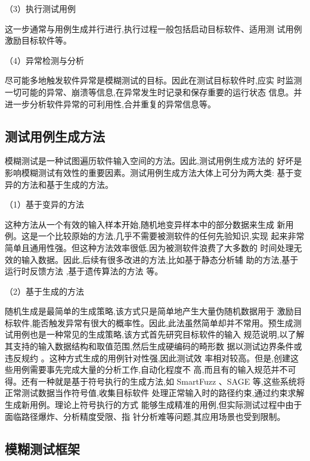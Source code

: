 （3）执行测试用例

这一步通常与用例生成并行进行,执行过程一般包括启动目标软件、适用测
试用例激励目标软件等。

（4）异常检测与分析

尽可能多地触发软件异常是模糊测试的目标。因此在测试目标软件时,应实
时监测一切可能的异常、崩溃等信息,在异常发生时记录和保存重要的运行状态
信息。并进一步分析软件异常的可利用性,合并重复的异常信息等。

\subsection{测试用例生成方法}

模糊测试是一种试图遍历软件输入空间的方法。因此,测试用例生成方法的
好坏是影响模糊测试有效性的重要因素。测试用例生成方法大体上可分为两大类:
基于变异的方法和基于生成的方法。

（1）基于变异的方法

这种方法从一个有效的输入样本开始,随机地变异样本中的部分数据来生成
新用例。这是一个比较原始的方法,几乎不需要被测软件的任何先验知识,实现
起来非常简单且通用性强。但这种方法效率很低,因为被测软件浪费了大多数的
时间处理无效的输入数据。因此,后续有很多改进的方法,比如基于静态分析辅
助的方法,基于运行时反馈方法 ,基于遗传算法的方法 等。

（2）基于生成的方法

随机生成是最简单的生成策略,该方式只是简单地产生大量伪随机数据用于
激励目标软件,能否触发异常有很大的概率性。因此,此法虽然简单却并不常用。预生成测试用例也是一种常见的生成策略,该方式首先研究目标软件的输入
规范说明,以了解其支持的输入数据结构和取值范围,然后生成硬编码的畸形数
据以测试边界条件或违反规约 。这种方式生成的用例针对性强,因此测试效
率相对较高。但是,创建这些用例需要事先完成大量的分析工作,自动化程度不
高,而且有的输入规范并不可得。还有一种就是基于符号执行的生成方法,如
SmartFuzz 、SAGE 等,这些系统将正常测试数据当作符号值,收集目标软件
处理正常输入时的路径约束,通过约束求解生成新用例。理论上符号执行的方式
能够生成精准的用例,但实际测试过程中由于面临路径爆炸、分析精度受限、指
针分析难等问题,其应用场景也受到限制。

\subsection{模糊测试框架}

